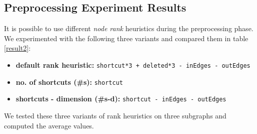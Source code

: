 \subsection{Preprocessing Experiment Results}

It is possible to use different {\em node rank} heuristics during the
preprocessing phase. We experimented with the following three variants 
and compared them in table \ref{result2}:

\begin{itemize}
    \item {\bf default rank heuristic:} {\tt shortcut*3 + deleted*3 -~inEdges -~outEdges} 
    \item {\bf no. of shortcuts (\#s):} {\tt shortcut} 
    \item {\bf shortcuts - dimension (\#s-d):} {\tt shortcut -~inEdges -~outEdges} 
\end{itemize}

We tested these three variants of rank heuristics on three 
subgraphs and computed the average values.

